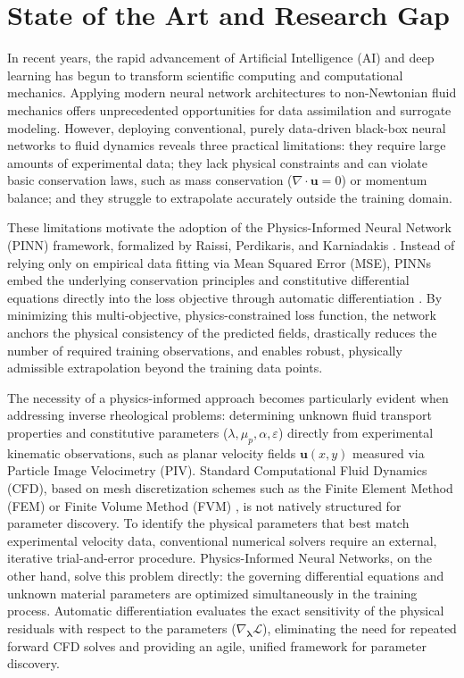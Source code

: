 \section{State of the Art and Research Gap}
\label{sec:state_of_the_art}

In recent years, the rapid advancement of Artificial Intelligence (AI) and deep
learning has begun to transform scientific computing and computational mechanics.
Applying modern neural network architectures to non-Newtonian fluid mechanics
offers unprecedented opportunities for data assimilation and surrogate modeling.
However, deploying conventional, purely data-driven black-box neural networks to
fluid dynamics reveals three practical limitations:
they require large amounts of experimental data;
they lack physical constraints and can violate basic conservation laws,
such as mass conservation ($\nabla \cdot \boldsymbol{u} = 0$) or momentum balance;
and they struggle to extrapolate accurately outside the training domain.

These limitations motivate the adoption of the Physics-Informed Neural Network
(PINN) framework, formalized by Raissi, Perdikaris, and Karniadakis
\cite{raissi2019physics, cuomo2022scientific}. Instead of relying only on
empirical data fitting via Mean Squared Error (MSE), PINNs embed the underlying
conservation principles and constitutive differential equations directly into the
loss objective through automatic differentiation \cite{baydin2018automatic}.
By minimizing this multi-objective, physics-constrained loss function, the network
anchors the physical consistency of the predicted fields, drastically reduces the
number of required training observations, and enables robust, physically admissible
extrapolation beyond the training data points.

The necessity of a physics-informed approach becomes particularly evident when
addressing inverse rheological problems: determining unknown fluid transport
properties and constitutive parameters ($\lambda, \mu_p, \alpha, \varepsilon$)
directly from experimental kinematic observations, such as planar velocity fields
$\boldsymbol{u}(x, y)$ measured via Particle Image Velocimetry (PIV). Standard
Computational Fluid Dynamics (CFD), based on mesh discretization schemes such as
the Finite Element Method (FEM) or Finite Volume Method (FVM) \cite{owens2002computational},
is not natively structured for parameter discovery. To identify the physical
parameters that best match experimental velocity data, conventional numerical
solvers require an external, iterative trial-and-error procedure. 
Physics-Informed Neural Networks, on the other hand, solve this problem directly:
the governing differential equations and unknown material parameters are
optimized simultaneously in the training process. Automatic differentiation
evaluates the exact sensitivity of the physical residuals with respect to the
parameters ($\nabla_{\boldsymbol{\lambda}} \mathcal{L}$), eliminating the need for
repeated forward CFD solves and providing an agile, unified framework for parameter
discovery.

